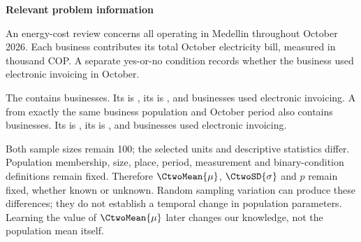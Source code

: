 \secInicio[][sec:p1]

\clearpage



\textbf{Relevant problem information}

\begin{probleminfoexcerpt}
An energy-cost review concerns all     operating in Medellin throughout October 2026. Each business contributes its total October electricity bill, measured in thousand COP. A separate yes-or-no condition records whether the business used electronic invoicing in October.
\end{probleminfoexcerpt}

\begin{probleminfoexcerpt}
The     contains  businesses. Its   is   , its    is   , and  businesses used electronic invoicing. A     from exactly the same business population and October period also contains  businesses. Its   is   , its    is   , and  businesses used electronic invoicing.
\end{probleminfoexcerpt}



Both sample sizes remain 100; the selected units and descriptive statistics differ. Population membership, size, place, period, measurement and binary-condition definitions remain fixed. Therefore $\CtwoMean{\mu}$, $\CtwoSD{\sigma}$ and $p$ remain fixed, whether known or unknown. Random sampling variation can produce these differences; they do not establish a temporal change in population parameters. Learning the value of $\CtwoMean{\mu}$ later changes our knowledge, not the population mean itself.

